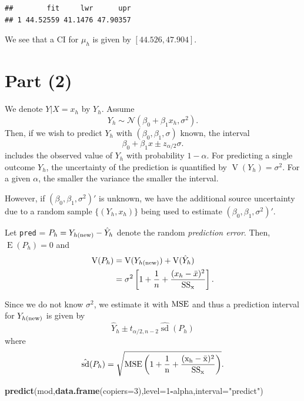 \documentclass[
]{article}
\newenvironment{Shaded}{\begin{snugshade}}{\end{snugshade}}
\newcommand{\AttributeTok}[1]{\textcolor[rgb]{0.13,0.29,0.53}{#1}}
\newcommand{\DecValTok}[1]{\textcolor[rgb]{0.00,0.00,0.81}{#1}}
\newcommand{\FunctionTok}[1]{\textcolor[rgb]{0.13,0.29,0.53}{\textbf{#1}}}
\newcommand{\NormalTok}[1]{#1}
\newcommand{\SpecialCharTok}[1]{\textcolor[rgb]{0.81,0.36,0.00}{\textbf{#1}}}
\newcommand{\StringTok}[1]{\textcolor[rgb]{0.31,0.60,0.02}{#1}}
\begin{document}
\begin{verbatim}
##        fit     lwr      upr
## 1 44.52559 41.1476 47.90357
\end{verbatim}

We see that a CI for \(\mu_h\) is given by \([44.526,47.904]\).

\hypertarget{part-2}{%
\section{Part (2)}\label{part-2}}


We denote \(Y|X=x_h\) by \(Y_h\). Assume \[
  Y_h \sim \mathcal{N}(\beta_0 + \beta_1 x_h, \sigma^2).
\] Then, if we wish to predict \(Y_h\) with \((\beta_0,\beta_1,\sigma)\)
known, the interval \[
  \beta_0 + \beta_1 x \pm z_{\alpha/2} \sigma.
\] includes the observed value of \(Y_h\) with probability \(1-\alpha\).
For predicting a single outcome \(Y_h\), the uncertainty of the
prediction is quantified by \(\operatorname{V}(Y_h) = \sigma^2\). For a
given \(\alpha\), the smaller the variance the smaller the interval.

However, if \((\beta_0,\beta_1,\sigma^2)'\) is unknown, we have the
additional source uncertainty due to a random sample \(\{(Y_h,x_h)\}\)
being used to estimate \((\beta_0,\beta_1,\sigma^2)'\).

Let \texttt{pred} = \(P_h = Y_{h(\rm{new})} - \hat{Y}_h\) denote the
random \emph{prediction error}. Then, \(\operatorname{E}(P_h) = 0\) and
\begin{align*}
  \operatorname{V}(P_h) &= \operatorname{V}(Y_{h(\rm{new})}) + \operatorname{V}(\hat{Y}_h)\\
            &= \sigma^2\left[1 + \frac{1}{n} + \frac{(x_h - \bar{x})^2}{\rm{SS}_x}\right].
\end{align*}

Since we do not know \(\sigma^2\), we estimate it with \(\rm{MSE}\) and
thus a prediction interval for \(Y_{h(\rm{new})}\) is given by \[
  \hat{Y}_h \pm t_{\alpha/2,n-2} \hat{\operatorname{sd}}(P_h)
\] where \[
  \hat{\operatorname{sd}}(P_h) = \sqrt{\rm{MSE}\left(1 + \frac{1}{n} + \frac{(x_h-\bar{x})^2}{\rm{SS}_x}\right)}.
\]

\begin{Shaded}
\begin{Highlighting}[]
\FunctionTok{predict}\NormalTok{(mod,}\FunctionTok{data.frame}\NormalTok{(}\AttributeTok{copiers=}\DecValTok{3}\NormalTok{),}\AttributeTok{level=}\DecValTok{1}\SpecialCharTok{{-}}\NormalTok{alpha,}\AttributeTok{interval=}\StringTok{"predict"}\NormalTok{)}
\end{Highlighting}
\end{Shaded}
\end{document}

